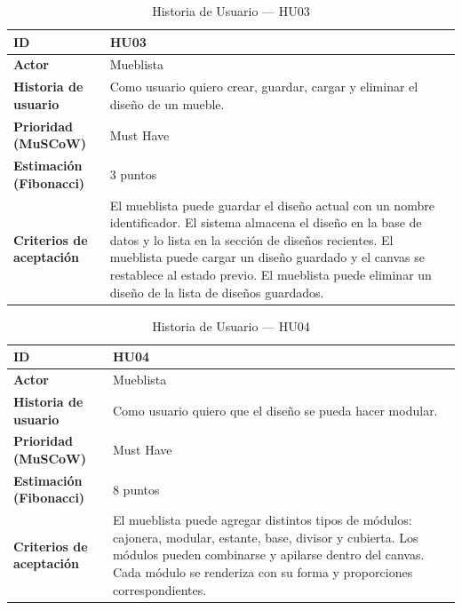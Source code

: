 ﻿\documentclass{iccmemoria}
\begin{document}
\begin{table}[H]
\centering
\caption{Historia de Usuario — HU03}
\begin{tabular}{|p{4.5cm}|p{9.5cm}|}
\hline
\textbf{ID} & HU03 \\
\hline
\textbf{Actor} & Mueblista \\
\hline
\textbf{Historia de usuario} & Como usuario quiero crear, guardar, cargar y eliminar el diseño de un mueble. \\
\hline
\textbf{Prioridad (MuSCoW)} & Must Have \\
\hline
\textbf{Estimación (Fibonacci)} & 3 puntos \\
\hline
\textbf{Criterios de aceptación} & El mueblista puede guardar el diseño actual con un nombre identificador.\newline
El sistema almacena el diseño en la base de datos y lo lista en la sección de diseños recientes.\newline
El mueblista puede cargar un diseño guardado y el canvas se restablece al estado previo.\newline
El mueblista puede eliminar un diseño de la lista de diseños guardados. \\
\hline
\end{tabular}
\end{table}

\begin{table}[H]
\centering
\caption{Historia de Usuario — HU04}
\begin{tabular}{|p{4.5cm}|p{9.5cm}|}
\hline
\textbf{ID} & HU04 \\
\hline
\textbf{Actor} & Mueblista \\
\hline
\textbf{Historia de usuario} & Como usuario quiero que el diseño se pueda hacer modular. \\
\hline
\textbf{Prioridad (MuSCoW)} & Must Have \\
\hline
\textbf{Estimación (Fibonacci)} & 8 puntos \\
\hline
\textbf{Criterios de aceptación} & El mueblista puede agregar distintos tipos de módulos: cajonera, modular, estante, base, divisor y cubierta.\newline
Los módulos pueden combinarse y apilarse dentro del canvas.\newline
Cada módulo se renderiza con su forma y proporciones correspondientes. \\
\hline
\end{tabular}
\end{table}
\end{document}
